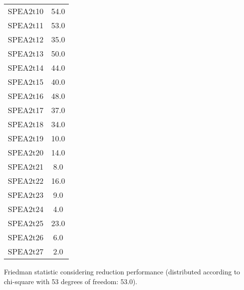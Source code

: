 \documentclass{article}
\begin{document}
\begin{table}[!htp]
\begin{tabular}{c|c}
SPEA2t10&54.0\\
SPEA2t11&53.0\\
SPEA2t12&35.0\\
SPEA2t13&50.0\\
SPEA2t14&44.0\\
SPEA2t15&40.0\\
SPEA2t16&48.0\\
SPEA2t17&37.0\\
SPEA2t18&34.0\\
SPEA2t19&10.0\\
SPEA2t20&14.0\\
SPEA2t21&8.0\\
SPEA2t22&16.0\\
SPEA2t23&9.0\\
SPEA2t24&4.0\\
SPEA2t25&23.0\\
SPEA2t26&6.0\\
SPEA2t27&2.0\\
\end{tabular}
\end{table}


Friedman statistic considering reduction performance (distributed according to chi-square with 53 degrees of freedom: 53.0).
\end{document}
